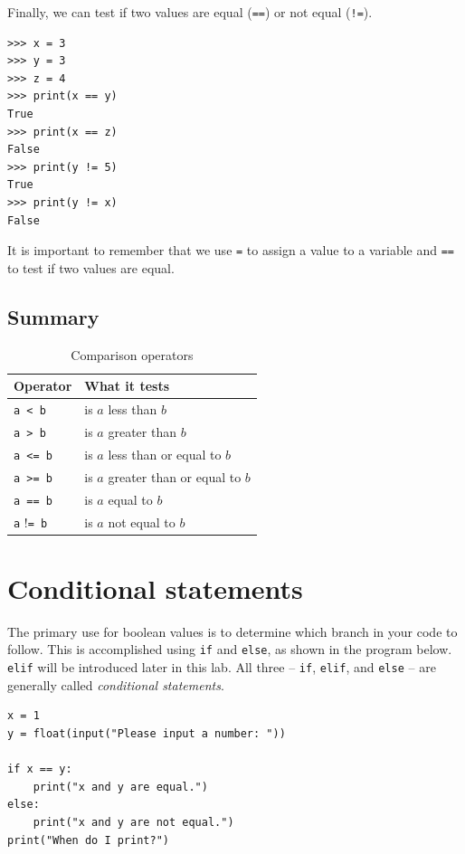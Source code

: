 \documentclass[11pt,hidelinks]{article}
\begin{document}
Finally, we can test if two values are equal
(\lstinline{==}) or not equal (\lstinline{!=}).
\begin{lstlisting}[style=ipython]
>>> x = 3
>>> y = 3
>>> z = 4
>>> print(x == y)
True
>>> print(x == z)
False
>>> print(y != 5)
True
>>> print(y != x)
False
\end{lstlisting}

It is important to remember that we use \lstinline{=} to assign a value to a variable and \lstinline{==} to test if two values are equal.

\pagebreak
\subsection{Summary}

\begin{table}[!ht]
  \centering
  \begin{tabular}{ll}
    \toprule
    Operator & What it tests\\
    \midrule
    \lstinline!a < b! & is $a$ less than $b$ \\
    \lstinline!a > b! & is $a$ greater than $b$ \\
    \lstinline!a <= b! & is $a$ less than or equal to $b$ \\
    \lstinline!a >= b! & is $a$ greater than or equal to $b$ \\
    \lstinline!a == b! & is $a$ equal to $b$ \\
    \lstinline!a! !\lstinline!= b! & is $a$ not equal to $b$ \\
    \bottomrule
  \end{tabular}
  \caption{Comparison operators}
  \label{tab:cmpops}
\end{table}

\pagebreak
\section{Conditional statements}

The primary use for boolean values is to determine which branch in your code to
follow. This is accomplished using \lstinline{if} and \lstinline{else}, as shown
in the program below. \lstinline!elif! will be introduced later in this lab. All
three -- \lstinline!if!, \lstinline!elif!, and \lstinline!else! -- are generally
called \emph{conditional statements}.

\begin{lstlisting}[style=python]
x = 1
y = float(input("Please input a number: "))

if x == y:
    print("x and y are equal.")
else:
    print("x and y are not equal.")
print("When do I print?")
\end{lstlisting}
\end{document}
